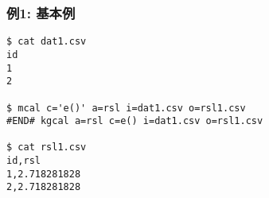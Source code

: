 
\subsubsection*{例1: 基本例}


\begin{Verbatim}[baselinestretch=0.7,frame=single]
$ cat dat1.csv
id
1
2

$ mcal c='e()' a=rsl i=dat1.csv o=rsl1.csv
#END# kgcal a=rsl c=e() i=dat1.csv o=rsl1.csv

$ cat rsl1.csv
id,rsl
1,2.718281828
2,2.718281828
\end{Verbatim}
